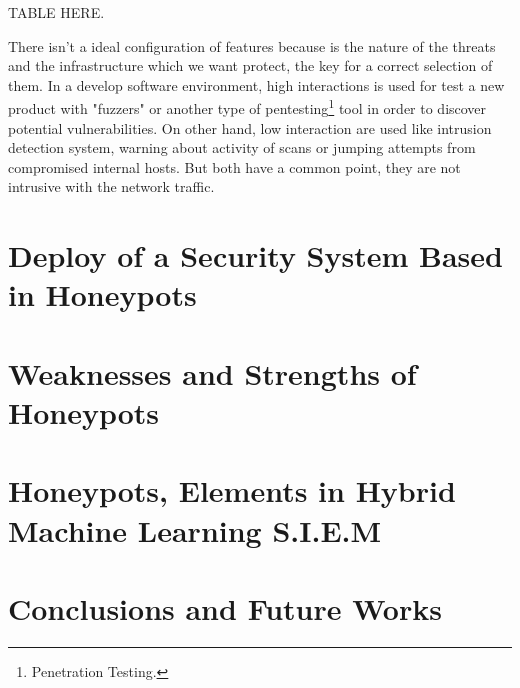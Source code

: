 \documentclass[a4paper]{llncs}
\begin{document}
TABLE HERE.

There isn't a ideal configuration of features because is the nature of the threats and the infrastructure which we want protect, the key for a correct selection of them. In a develop software environment, high interactions is used for test a new product with "fuzzers" or another type of pentesting\footnote{Penetration Testing.} tool in order to discover potential vulnerabilities. On other hand, low interaction are used like intrusion detection system, warning about activity of scans or jumping attempts from compromised internal hosts. But both have a common point, they are not intrusive with the network traffic.

\section{Deploy of a Security System Based in Honeypots}



\section{Weaknesses and Strengths of Honeypots}

\section{Honeypots, Elements in Hybrid Machine Learning S.I.E.M}

\section{Conclusions and Future Works}
\end{document}
